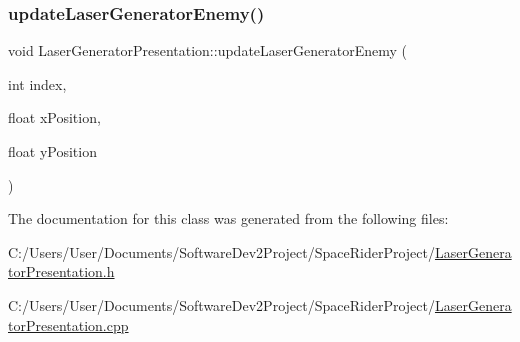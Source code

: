 \subsubsection{\texorpdfstring{update\+Laser\+Generator\+Enemy()}{updateLaserGeneratorEnemy()}}
{\footnotesize\ttfamily void Laser\+Generator\+Presentation\+::update\+Laser\+Generator\+Enemy (\begin{DoxyParamCaption}\item[{int}]{index,  }\item[{float}]{x\+Position,  }\item[{float}]{y\+Position }\end{DoxyParamCaption})}



The documentation for this class was generated from the following files\+:\begin{DoxyCompactItemize}
\item 
C\+:/\+Users/\+User/\+Documents/\+Software\+Dev2\+Project/\+Space\+Rider\+Project/\hyperlink{_laser_generator_presentation_8h}{Laser\+Generator\+Presentation.\+h}\item 
C\+:/\+Users/\+User/\+Documents/\+Software\+Dev2\+Project/\+Space\+Rider\+Project/\hyperlink{_laser_generator_presentation_8cpp}{Laser\+Generator\+Presentation.\+cpp}\end{DoxyCompactItemize}
